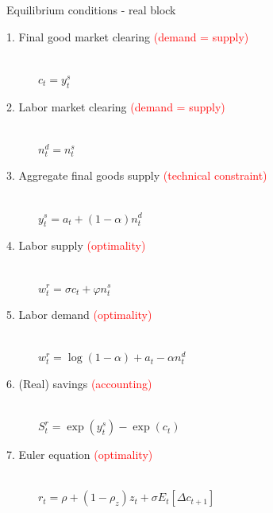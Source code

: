 
\begin{frame}{Equilibrium conditions - real block}

\begin{description}
\item[1. Final good market clearing \textcolor{red}{(demand = supply)}] 			\hfill \\ 	$c_{t} = y^{s}_{t}$
\item[2. Labor market clearing \textcolor{red}{(demand = supply)}]				\hfill \\	$n^{d}_{t} = n^{s}_{t}$
\item[3. Aggregate final goods supply \textcolor{red}{(technical constraint)}]		\hfill \\	$y^{s}_{t} = a_{t} + \left( 1-\alpha \right)n^{d}_{t}$
\item[4. Labor supply \textcolor{red}{(optimality)}]	\hfill \\	$w^{r}_{t} = \sigma c_{t} + \varphi n^{s}_{t}$
\item[5. Labor demand \textcolor{red}{(optimality)}]	\hfill \\	$w^{r}_{t} = \log{\left( 1-\alpha \right)} + a_{t} - \alpha n^{d}_{t}$
\item[6. (Real) savings \textcolor{red}{(accounting)}]					\hfill \\	$S^{r}_{t} = \exp{(y^{s}_{t})} - \exp{(c_{t})}$
\item[7. Euler equation \textcolor{red}{(optimality)}]	\hfill \\	$r_{t} = \rho + \left( 1-\rho_{z} \right) z_{t}+ \sigma E_{t} \left[ \Delta c_{t+1} \right]$
\end{description}

\end{frame}



